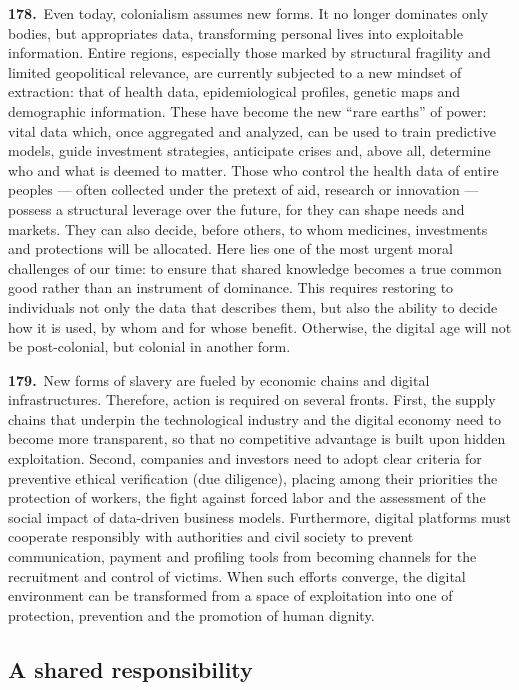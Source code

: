 \documentclass{article}
\begin{document}
\textbf{178.}\ Even today, colonialism assumes new forms. It no longer dominates only bodies, but appropriates data, transforming personal lives into exploitable information. Entire regions, especially those marked by structural fragility and limited geopolitical relevance, are currently subjected to a new mindset of extraction: that of health data, epidemiological profiles, genetic maps and demographic information. These have become the new ``rare earths'' of power: vital data which, once aggregated and analyzed, can be used to train predictive models, guide investment strategies, anticipate crises and, above all, determine who and what is deemed to matter. Those who control the health data of entire peoples --- often collected under the pretext of aid, research or innovation --- possess a structural leverage over the future, for they can shape needs and markets. They can also decide, before others, to whom medicines, investments and protections will be allocated. Here lies one of the most urgent moral challenges of our time: to ensure that shared knowledge becomes a true common good rather than an instrument of dominance. This requires restoring to individuals not only the data that describes them, but also the ability to decide how it is used, by whom and for whose benefit. Otherwise, the digital age will not be post-colonial, but colonial in another form.

\textbf{179.}\ New forms of slavery are fueled by economic chains and digital infrastructures. Therefore, action is required on several fronts. First, the supply chains that underpin the technological industry and the digital economy need to become more transparent, so that no competitive advantage is built upon hidden exploitation. Second, companies and investors need to adopt clear criteria for preventive ethical verification (due diligence), placing among their priorities the protection of workers, the fight against forced labor and the assessment of the social impact of data-driven business models. Furthermore, digital platforms must cooperate responsibly with authorities and civil society to prevent communication, payment and profiling tools from becoming channels for the recruitment and control of victims. When such efforts converge, the digital environment can be transformed from a space of exploitation into one of protection, prevention and the promotion of human dignity.

\subsection{A shared responsibility}
\end{document}
